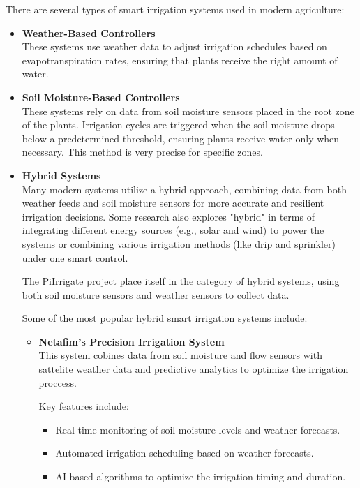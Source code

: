 There are several types of smart irrigation systems used in modern agriculture:

\begin{itemize}
  \item \textbf{Weather-Based Controllers} \\
  These systems use weather data to adjust irrigation schedules based on evapotranspiration rates, 
  ensuring that plants receive the right amount of water.

  \item \textbf{Soil Moisture-Based Controllers} \\
  These systems rely on data from soil moisture sensors placed in the root zone of the plants.
  Irrigation cycles are triggered when the soil moisture drops below a predetermined threshold, 
  ensuring plants receive water only when necessary.
  This method is very precise for specific zones\cite{smartIrrigationTechnologyControllersAndSensors}.

  \item \textbf{Hybrid Systems} \\
  Many modern systems utilize a hybrid approach, combining data from both
  weather feeds and soil moisture sensors for more accurate and resilient 
  irrigation decisions. Some research also explores "hybrid" in terms of 
  integrating different energy sources (e.g., solar and wind) to power the systems or 
  combining various 
  irrigation methods (like drip and sprinkler) under one smart control\cite{soilBasedIrrigation}.

  The PiIrrigate project place itself in the category of hybrid systems, using both
  soil moisture sensors and weather sensors to collect data.
  
  Some of the most popular hybrid smart irrigation systems include:
  \begin{itemize}
    \item \textbf{Netafim's Precision Irrigation System} \\
    This system cobines data from soil moisture and flow sensors with sattelite weather data and predictive
    analytics to optimize the irrigation proccess.
    
    Key features include:
    \begin{itemize}
      \item Real-time monitoring of soil moisture levels and weather forecasts.
      \item Automated irrigation scheduling based on weather forecasts.
      \item AI-based algorithms to optimize the irrigation timing and duration.
    \end{itemize}


\end{itemize}
\end{itemize}
